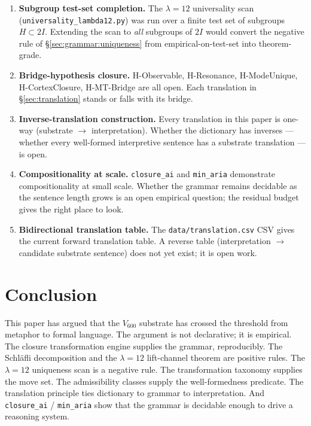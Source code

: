 \documentclass[11pt,a4paper]{article}
\begin{document}
\begin{enumerate}[leftmargin=*]
  \item \textbf{Subgroup test-set completion.} The
        $\lambda = 12$ universality scan
        (\texttt{universality\_lambda12.py}) was run over a finite
        test set of subgroups $H \subset 2I$. Extending the scan
        to \emph{all} subgroups of $2I$ would convert the negative
        rule of \S\ref{sec:grammar:uniqueness} from
        empirical-on-test-set into theorem-grade.
  \item \textbf{Bridge-hypothesis closure.}
        H-Observable, H-Resonance, H-ModeUnique,
        H-CortexClosure, H-MT-Bridge are all open. Each
        translation in \S\ref{sec:translation} stands or falls
        with its bridge.
  \item \textbf{Inverse-translation construction.} Every
        translation in this paper is one-way (substrate $\to$
        interpretation). Whether the dictionary has inverses ---
        whether every well-formed interpretive sentence has a
        substrate translation --- is open.
  \item \textbf{Compositionality at scale.} \texttt{closure\_ai}
        and \texttt{min\_aria} demonstrate compositionality at
        small scale. Whether the grammar remains decidable as the
        sentence length grows is an open empirical question; the
        residual budget gives the right place to look.
  \item \textbf{Bidirectional translation table.} The
        \texttt{data/translation.csv} CSV gives the current
        forward translation table. A reverse table
        (interpretation $\to$ candidate substrate sentence) does
        not yet exist; it is open work.
\end{enumerate}

\section{Conclusion}
\label{sec:conclusion}

This paper has argued that the $V_{600}$ substrate has crossed the
threshold from metaphor to formal language. The argument is not
declarative; it is empirical. The closure transformation engine
supplies the grammar, reproducibly. The Schl\"afli decomposition
and the $\lambda = 12$ lift-channel theorem are positive rules.
The $\lambda = 12$ uniqueness scan is a negative rule. The
transformation taxonomy supplies the move set. The admissibility
classes supply the well-formedness predicate. The translation
principle ties dictionary to grammar to interpretation. And
\texttt{closure\_ai} / \texttt{min\_aria} show that the grammar is
decidable enough to drive a reasoning system.
\end{document}
